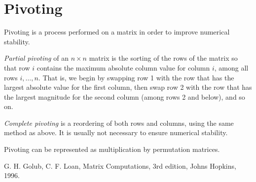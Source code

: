 \documentclass{article}
\begin{document}
\section{Pivoting}

Pivoting is a process performed on a matrix in order to improve numerical stability.

\emph{Partial pivoting} of an $n \times n$ matrix is the sorting of the rows of the matrix so that row $i$ contains the maximum absolute column value for column $i$, among all rows $i, \ldots, n$. That is, we begin by swapping row 1 with the row that has the largest absolute value for the first column, then swap row 2 with the row that has the largest magnitude for the second column (among rows 2 and below), and so on.

\emph{Complete pivoting} is a reordering of both rows and columns, using the same method as above.  It is usually not necessary to ensure numerical stability.

Pivoting can be represented as multiplication by permutation matrices.

\begin{thebibliography}{3}
 G. H. Golub, C. F. Loan, Matrix Computations, 3rd edition, Johns Hopkins, 1996.
\end{thebibliography}
\end{document}
